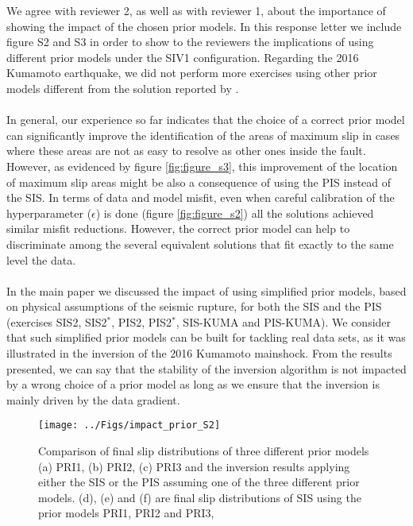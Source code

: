 \documentclass[10pt]{extarticle}
\begin{document}
\begin{Answer}
We agree with reviewer 2, as well as with reviewer 1, about the
importance of showing the impact of the chosen prior models.
In this response letter we include figure S2 and S3 in order to 
show to the reviewers the implications of using different prior models 
under the SIV1 configuration. Regarding the 2016 Kumamoto earthquake, 
we did not perform more exercises using other prior models different 
from the solution reported by \citep{Asano_2016_SRP}.\\
\\
In general, our experience so far indicates that the choice 
of a correct prior model can significantly improve the identification
of the areas of maximum slip in cases where these areas are not 
as easy to resolve as other ones inside the fault. However, as evidenced 
by figure \ref{fig:figure_s3}, this improvement of the location of maximum 
slip areas might be also a consequence of using the PIS instead of
the SIS. In terms of data and model misfit, even when careful calibration 
of the hyperparameter ($\epsilon$) is done (figure \ref{fig:figure_s2})
all the solutions achieved similar misfit reductions. However, the correct
prior model can help to discriminate among the several equivalent solutions
that fit exactly to the same level the data.  \\
\\
In the main paper we discussed the impact of using simplified prior models,
based on physical assumptions of the seismic rupture, for both the SIS and the PIS 
(exercises SIS2, SIS2$^*$, PIS2, PIS2$^*$, SIS-KUMA and PIS-KUMA). We consider that 
such simplified prior models can be built for tackling real data sets, as it was 
illustrated in the inversion of the 2016 Kumamoto mainshock. From the results presented,
we can say that the stability of the inversion algorithm is not impacted by a wrong 
choice of a prior model as long as we ensure that the inversion is mainly driven 
by the data gradient.
\begin{figure}[!h]
\begin{center}
  \texttt{[image: ../Figs/impact\_prior\_S2]} 
\end{center}
  \caption{Comparison of final slip distributions of three different prior 
    models (a) PRI1, (b) PRI2, (c) PRI3 and the inversion results applying either the SIS or 
    the PIS assuming one of the three different prior models. (d), (e) and (f) 
    are final slip distributions of SIS using the prior models PRI1, PRI2 and PRI3,
}
\end{figure}
\end{Answer}
\end{document}
